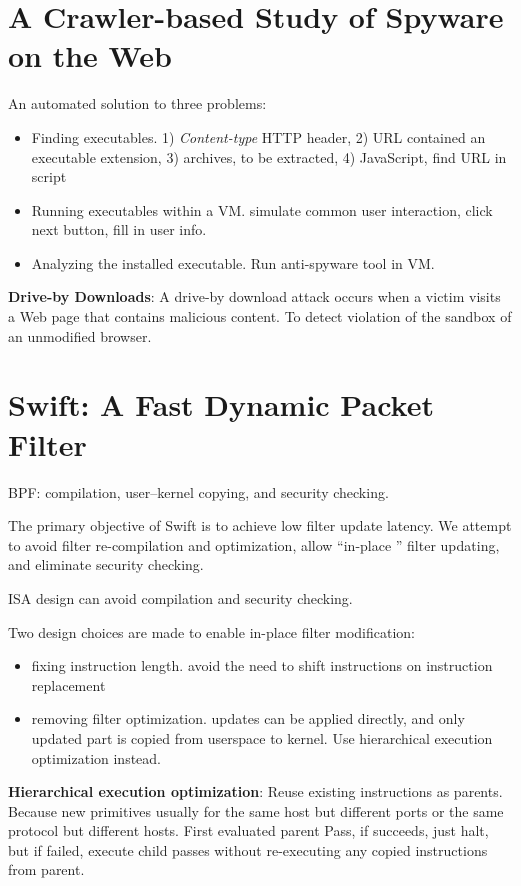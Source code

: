 \documentclass[]{article}
\begin{document}
\section{A Crawler-based Study of Spyware on the Web}
An automated solution to three problems:
\begin{itemize}
 \item Finding executables. 1) \textit{Content-type} HTTP header,
 2) URL contained an executable extension, 3) archives, to be extracted,
 4) JavaScript, find URL in script
 \item Running executables within a VM. simulate common user interaction,
 click next button, fill in user info.
 \item Analyzing the installed executable. Run anti-spyware tool in VM.
\end{itemize}

\textbf{Drive-by Downloads}: A drive-by download attack occurs 
when a victim visits a Web page that contains malicious content. 
To detect violation of the sandbox of an unmodified browser.

\section{Swift: A Fast Dynamic Packet Filter}
BPF: compilation, user–kernel copying, and security checking.

The primary objective of Swift is to achieve low filter update latency.
We attempt to avoid filter re-compilation and optimization, allow 
``in-place ” filter updating, and eliminate security checking.

ISA design can avoid compilation and security checking.

Two design choices are made to enable in-place filter modification: 
\begin{itemize}
 \item fixing instruction length. avoid the need to shift instructions
 on instruction replacement
 \item removing filter optimization. updates can be applied directly,
 and only updated part is copied from userspace to kernel. Use 
 hierarchical execution optimization instead.
\end{itemize}

\textbf{Hierarchical execution optimization}: Reuse existing instructions
as parents. Because new primitives usually for the same host but different
ports or the same protocol but different hosts. First evaluated parent Pass,
if succeeds, just halt, but if failed, execute child passes without re-executing
any copied instructions from parent.
\end{document}
